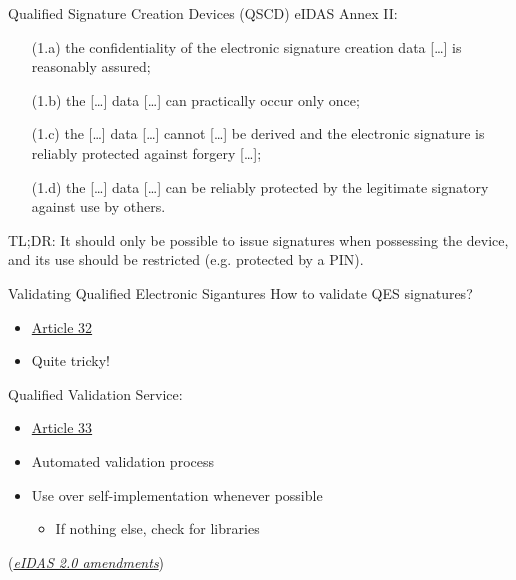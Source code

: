 \begin{frame}{Qualified Signature Creation Devices (QSCD)}
  \pause
  eIDAS Annex II:
  \settowidth{\offset}{1.a}
  \addtolength{\leftmargini}{\offset}
  \begin{enumerate}[<+(1)->]
    \item[(1.a)] the confidentiality of the electronic signature creation data [\dots] is reasonably assured;
    \item[(1.b)] the [\dots] data [\dots] can practically occur only once;
    \item[(1.c)] the [\dots] data [\dots] cannot [\dots] be derived and the electronic signature is reliably protected against forgery [\dots];
    \item[(1.d)] the [\dots] data [\dots] can be reliably protected by the legitimate signatory against use by others.
  \end{enumerate}

  \pause
  TL;DR: It should only be possible to issue signatures when possessing the device, and its use should be restricted (e.g. protected by a PIN).
\end{frame}

\begin{frame}{Validating Qualified Electronic Sigantures}
  How to validate QES signatures?
  \begin{itemize}[<+(1)->]
    \item \href{https://eur-lex.europa.eu/legal-content/EN/TXT/HTML/?uri=CELEX\%3A32014R0910\#d1e2594-73-1}{Article 32}
    \item Quite tricky!
  \end{itemize}

  \pause
  Qualified Validation Service:
  \begin{itemize}
    \item \href{https://eur-lex.europa.eu/legal-content/EN/TXT/HTML/?uri=CELEX:32014R0910\#d1e2664-73-1}{Article 33}
    \item Automated validation process
    \item Use over self-implementation whenever possible
    \begin{itemize}
      \item If nothing else, check for libraries
    \end{itemize}
  \end{itemize}

  \pause
  (\href{https://eur-lex.europa.eu/legal-content/EN/TXT/HTML/?uri=OJ:L\_202401183\#d1e3370-1-1}{\textit{eIDAS 2.0 amendments}})
\end{frame}

